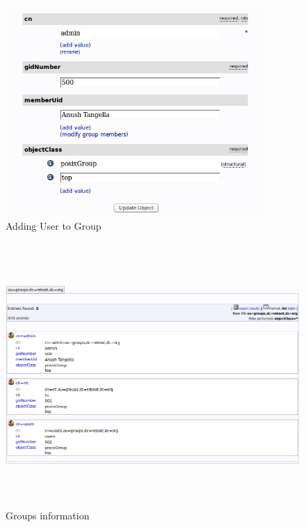 \documentclass[12pt]{report}
\begin{document}
		\begin{figure}[H]
		\begin{center}
		\includegraphics[width=10cm,height=8cm]{Screens/AddUsertoGroup.png}
		\caption{Adding User to Group \label{fig: Adding User to Group}}
		\end{center}
		\end{figure}
		
		\begin{figure}[H]
		\begin{center}
		\includegraphics[width=17cm,height=10cm]{Screens/Groupsinfo.png}
		\caption{Groups information \label{fig:Groups information}}
		\end{center}
		\end{figure}
		
\end{document}
